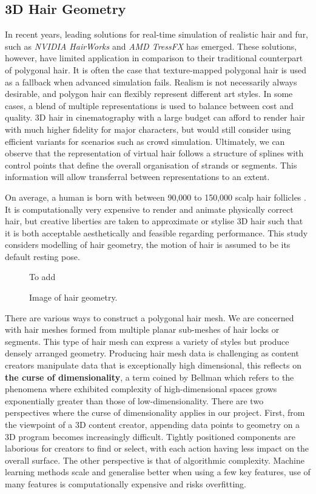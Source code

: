 \documentclass[ %
author={Dillon Keith Diep},
supervisor={Dr. Carl Henrik Ek},
degree={MEng},
title={ART-CG:},
subtitle={Assisted Real-time Content Generation of 3D Hair by Learning Manifolds},
type={Research},
year={2017} ]{dissertation}
\begin{document}
\subsection{3D Hair Geometry}
In recent years, leading solutions for real-time simulation of realistic hair and fur, such as \textit{NVIDIA HairWorks} and \textit{AMD TressFX} has emerged. These solutions, however, have limited application in comparison to their traditional counterpart of polygonal hair. It is often the case that texture-mapped polygonal hair is used as a fallback when advanced simulation fails. Realism is not necessarily always desirable, and polygon hair can flexibly represent different art styles. In some cases, a blend of multiple representations is used to balance between cost and quality. 3D hair in cinematography with a large budget can afford to render hair with much higher fidelity for major characters, but would still consider using efficient variants for scenarios such as crowd simulation. Ultimately, we can observe that the representation of virtual hair follows a structure of splines with control points that define the overall organisation of strands or segments. This information will allow transferral between representations to an extent.

On average, a human is born with between 90,000 to 150,000 scalp hair follicles \cite{hairfollicles}. It is computationally very expensive to render and animate physically correct hair, but creative liberties are taken to approximate or stylise 3D hair such that it is both acceptable aesthetically and feasible regarding performance. This study considers modelling of hair geometry, the motion of hair is assumed to be its default resting pose.

\begin{figure}[!h]
	\centering
	To add %
	\caption{Image of hair geometry.}
\end{figure}

There are various ways to construct a polygonal hair mesh. We are concerned with hair meshes formed from multiple planar sub-meshes of hair locks or segments. This type of hair mesh can express a variety of styles but produce densely arranged geometry. 
Producing hair mesh data is challenging as content creators manipulate data that is exceptionally high dimensional, this reflects on \textbf{the curse of dimensionality}, a term coined by Bellman \cite{curseofdyn} which refers to the phenomena where exhibited complexity of high-dimensional spaces grows exponentially greater than those of low-dimensionality. There are two perspectives where the curse of dimensionality applies in our project. First, from the viewpoint of a 3D content creator, appending data points to geometry on a 3D program becomes increasingly difficult. Tightly positioned components are laborious for creators to find or select, with each action having less impact on the overall surface. The other perspective is that of algorithmic complexity. Machine learning methods scale and generalise better when using a few key features, use of many features is computationally expensive and risks overfitting.
\end{document}
